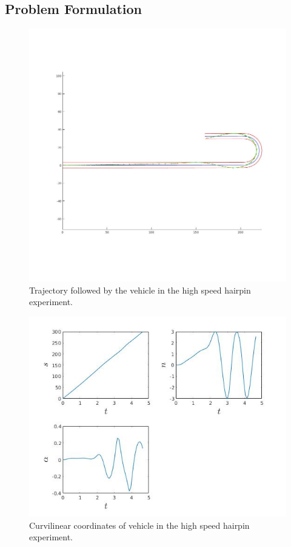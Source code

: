\documentclass[conference,11pt]{IEEEtran}
\begin{document}
\subsection{Problem Formulation}
\begin{figure}[t]
  \centering
  \includegraphics[scale=0.25]{hairpin_brake.jpg}
  \caption{Trajectory followed by the vehicle in the high speed hairpin experiment.}
  \label{fig:hptraj}
\end{figure}
\begin{figure}[b]
  \centering
  \includegraphics[scale=0.5]{hairpin_brake_curv.jpg}
  \caption{Curvilinear coordinates of vehicle in the high speed hairpin experiment.}
  \label{fig:hpcurv0}
\end{figure}
\end{document}

